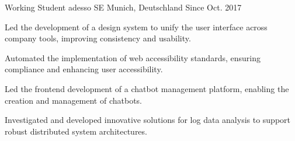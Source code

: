 
\begin{cventries}

  \cventry
  {Working Student} %
  {adesso SE} %
  {Munich, Deutschland} %
  {Since Oct. 2017} %
  {
    \begin{cvitems} %
      \item {Led the development of a design system to unify the user interface across company tools, improving consistency and usability.}
      \item {Automated the implementation of web accessibility standards, ensuring compliance and enhancing user accessibility.}
      \item {Led the frontend development of a chatbot management platform, enabling the creation and management of chatbots.}
      \item {Investigated and developed innovative solutions for log data analysis to support robust distributed system architectures.}
    \end{cvitems}
  }



\end{cventries}